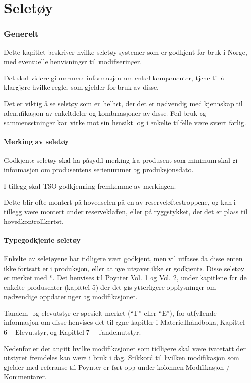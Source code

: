 \part{Seletøy}

\section{Generelt}
Dette kapitlet beskriver hvilke seletøy systemer som er godkjent for bruk i Norge, med eventuelle henvisninger til modifiseringer.

Det skal videre gi nærmere informasjon om enkeltkomponenter, tjene til å klargjøre hvilke regler som gjelder for bruk av disse.

Det er viktig å se seletøy som en helhet, der det er nødvendig med kjennskap til identifikasjon av enkeltdeler og kombinasjoner av disse. Feil bruk og sammensetninger kan virke mot sin hensikt, og i enkelte tilfelle være svært farlig.

\subsection{Merking av seletøy}
Godkjente seletøy skal ha påsydd merking fra produsent som minimum skal gi informasjon om produsentens serienummer og produksjonsdato.

I tillegg skal TSO godkjenning fremkomme av merkingen.

Dette blir ofte montert på hovedselen på en av reserveløftestroppene, og kan i tillegg være montert under reserveklaffen, eller på ryggstykket, der det er plass til hovedkontrollkortet.

\subsection{Typegodkjente seletøy}
Enkelte av seletøyene har tidligere vært godkjent, men vil utfases da disse enten ikke fortsatt er i produksjon, eller at nye utgaver ikke er godkjente. Disse seletøy er merket med *. Det henvises til Poynter Vol. 1 og Vol. 2, under kapitlene for de enkelte produsenter (kapittel 5) der det gis ytterligere opplysninger om nødvendige oppdateringer og modifikasjoner.

Tandem- og elevutstyr er spesielt merket (``T'' eller ``E''), for utfyllende informasjon om disse henvises det til egne kapitler i Materiellhåndboka, Kapittel 6 – Elevutstyr, og Kapittel 7 – Tandemutstyr.

Nedenfor er det angitt hvilke modifikasjoner som tidligere skal være ivaretatt der utstyret fremdeles kan være i bruk i dag. Stikkord til hvilken modifikasjon som gjelder med referanse til Poynter er ført opp under kolonnen Modifikasjon / Kommentarer.

